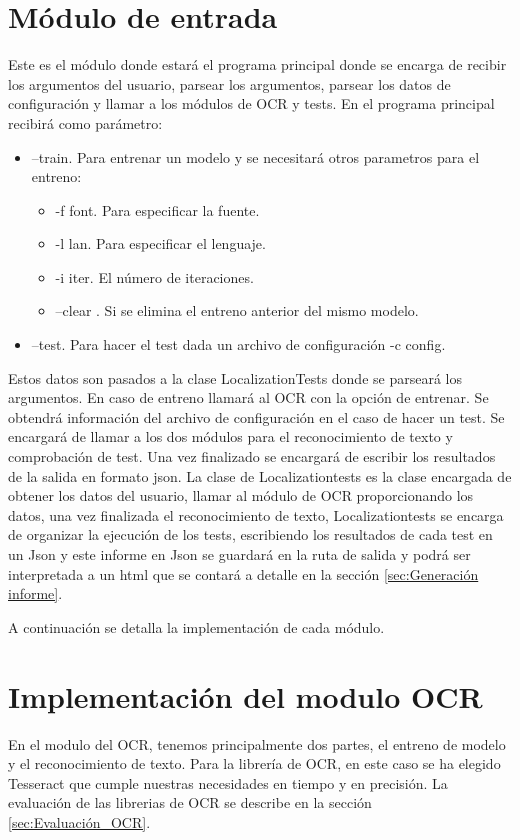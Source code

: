 \section{Módulo de entrada}
Este es el módulo donde estará el programa principal donde se encarga de recibir los argumentos del usuario, parsear los argumentos, parsear los datos de configuración y llamar a los módulos de OCR y tests.
En el programa principal recibirá como parámetro:
\begin{itemize}
	\item --train. Para entrenar un modelo y se necesitará otros parametros para el entreno:
	\begin{itemize}
		\item -f font. Para especificar la fuente.
		\item -l lan. Para especificar el lenguaje.
		\item -i iter. El número de iteraciones.
		\item --clear . Si se elimina el entreno anterior del mismo modelo.
	\end{itemize}
	\item --test. Para hacer el test dada un archivo de configuración -c config.
\end{itemize}
Estos datos son pasados a la clase LocalizationTests donde se parseará los argumentos. En caso de entreno llamará al OCR con la opción de entrenar. Se obtendrá información del archivo de configuración en el caso de hacer un test. Se encargará de llamar a los dos módulos para el reconocimiento de texto y comprobación de test. Una vez finalizado se encargará de escribir los resultados de la salida en formato json.
La clase de Localizationtests es la clase encargada de obtener los datos del usuario, llamar al módulo de OCR proporcionando los datos, una vez finalizada el reconocimiento de texto, Localizationtests se encarga de organizar la ejecución de los tests, escribiendo los resultados de cada test en un Json y este informe en Json se guardará en la ruta de salida y podrá ser interpretada a un html que se contará a detalle en la sección \ref{sec:Generación informe}.


A continuación se detalla la implementación de cada módulo.
\section{Implementación del modulo OCR}
\label{sec:Implementación del OCR}
En el modulo del OCR, tenemos principalmente dos partes, el entreno de modelo y el reconocimiento de texto. Para la librería de OCR, en este caso se ha elegido Tesseract que cumple nuestras necesidades en tiempo y en precisión. La evaluación de las librerias de OCR se describe en la sección \ref{sec:Evaluación_OCR}.
